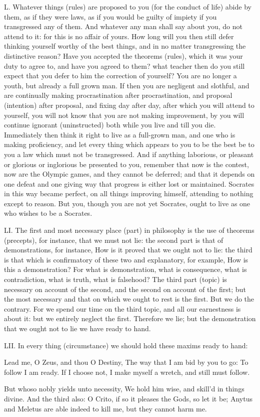 L. Whatever things (rules) are proposed to you (for the conduct of life) abide by them, as if they were laws, as if you would be guilty of impiety if you transgressed any of them. And whatever any man shall say about you, do not attend to it: for this is no affair of yours. How long will you then still defer thinking yourself worthy of the best things, and in no matter transgressing the distinctive reason? Have you accepted the theorems (rules), which it was your duty to agree to, and have you agreed to them? what teacher then do you still expect that you defer to him the correction of yourself? You are no longer a youth, but already a full grown man. If then you are negligent and slothful, and are continually making procrastination after procrastination, and proposal (intention) after proposal, and fixing day after day, after which you will attend to yourself, you will not know that you are not making improvement, by you will continue ignorant (uninstructed) both while you live and till you die. Immediately then think it right to live as a full-grown man, and one who is making proficiency, and let every thing which appears to you to be the best be to you a law which must not be transgressed. And if anything laborious, or pleasant or glorious or inglorious be presented to you, remember that now is the contest, now are the Olympic games, and they cannot be deferred; and that it depends on one defeat and one giving way that progress is either lost or maintained. Socrates in this way became perfect, on all things improving himself, attending to nothing except to reason. But you, though you are not yet Socrates, ought to live as one who wishes to be a Socrates.



LI. The first and most necessary place (part) in philosophy is the use of theorems (precepts), for instance, that we must not lie: the second part is that of demonstrations, for instance, How is it proved that we ought not to lie: the third is that which is confirmatory of these two and explanatory, for example, How is this a demonstration? For what is demonstration, what is consequence, what is contradiction, what is truth, what is falsehood? The third part (topic) is necessary on account of the second, and the second on account of the first; but the most necessary and that on which we ought to rest is the first. But we do the contrary. For we spend our time on the third topic, and all our earnestness is about it: but we entirely neglect the first. Therefore we lie; but the demonstration that we ought not to lie we have ready to hand.



LII. In every thing (circumstance) we should hold these maxims ready to hand:

Lead me, O Zeus, and thou O Destiny,
The way that I am bid by you to go:
To follow I am ready. If I choose not,
I make myself a wretch, and still must follow.

But whoso nobly yields unto necessity,
We hold him wise, and skill'd in things divine.
And the third also: O Crito, if so it pleases the Gods, so let it be; Anytus and Meletus are able indeed to kill me, but they cannot harm me.


